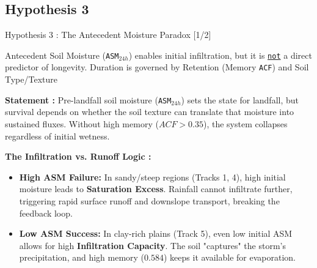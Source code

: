 \documentclass[8pt, aspectratio=169]{beamer}
\begin{document}
\subsection{Hypothesis 3}
\begin{frame}{Hypothesis 3 : The Antecedent Moisture Paradox [1/2]}
    \begin{block}{Antecedent Soil Moisture (\texttt{ASM$_{24h}$}) enables initial infiltration, but it is \underline{\texttt{not}} a direct predictor of longevity. Duration is governed by Retention (Memory \texttt{ACF}) and Soil Type/Texture}\end{block}

    \vspace{0.15cm}
    \footnotesize
    \textbf{Statement :} Pre-landfall soil moisture (\texttt{ASM$_{24h}$}) sets the state for landfall, but survival depends on whether the soil texture can translate that moisture into sustained fluxes. Without high memory ($ACF > 0.35$), the system collapses regardless of initial wetness.

    \vspace{0.15cm}
    \footnotesize
    \textbf{The Infiltration vs. Runoff Logic :}
    \begin{itemize}
        \item \textbf{High ASM Failure:} In sandy/steep regions (Tracks 1, 4), high initial moisture leads to \textbf{Saturation Excess}. Rainfall cannot infiltrate further, triggering rapid surface runoff and downslope transport, breaking the feedback loop. \cite{kishtawal2013enhancement}
        \item \textbf{Low ASM Success:} In clay-rich plains (Track 5), even low initial ASM allows for high \textbf{Infiltration Capacity}. The soil "captures" the storm's precipitation, and high memory ($0.584$) keeps it available for evaporation.
    \end{itemize}


\end{frame}
\end{document}
